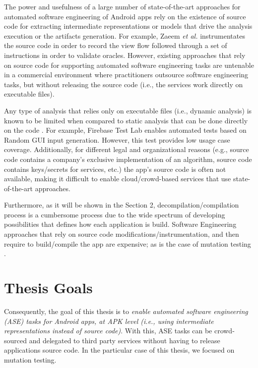 The power and usefulness of a large number of  state-of-the-art approaches for automated software engineering of Android apps rely on the existence of source code for extracting intermediate representations or models that drive the analysis execution or the artifacts generation. For example, Zaeem \textit{et al.}\cite{zaeem2014automated} instrumentates the source code in order to record the view flow followed through a set of instructions in order to validate oracles. However, existing approaches that rely on source code for supporting automated software engineering tasks are untenable in a commercial environment where practitioners  outsource software engineering tasks, but without releasing the source code (i.e., the services work directly on executable files). 

Any type of analysis that relies only on executable files (i.e., dynamic analysis) is known to be limited when compared to static analysis that can be done directly on the code \cite{spathoulas2014assessing}. For example, Firebase Test Lab enables automated tests based on Random GUI input generation. However, this test provides low usage case coverage. Additionally, for different legal and organizational reasons (e.g., source code contains a company's exclusive implementation of an algorithm, source code contains keys/secrets for services, etc.) the app's source code is often not available, making it difficult to enable cloud/crowd-based services that use state-of-the-art approaches.

Furthermore, as it will be shown in the Section 2, decompilation/compilation process is a cumbersome process due to the wide spectrum of developing possibilities that defines how each application is build. Software Engineering approaches that rely on source code modifications/instrumentation, and then require to build/compile the app are expensive; as is the case of mutation testing \cite{appelt2014automated,linares2017enabling,praphamontripong2016experimental,rodriguez2018mutode}.

\section{Thesis  Goals}

Consequently, the goal of this thesis is to \emph{enable automated software engineering (ASE) tasks for Android apps, at APK level (i.e., using intermediate representations instead of source code)}. With this, ASE tasks can be crowd-sourced and delegated to third party services without having to release applications source code. In the particular case of this thesis, we focused on mutation testing. 

